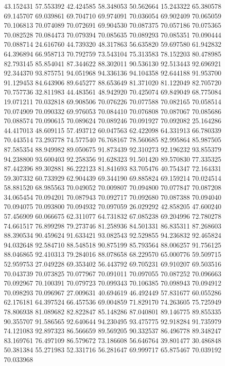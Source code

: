 43.152431
57.553392
42.424585
58.348053
50.562664
15.243322
65.380578
69.145707
69.039861
69.704710
69.974091
70.036054
69.902409
70.065059
70.106813
70.074089
70.072691
69.904530
70.087375
70.057186
70.075365
70.082528
70.084473
70.079394
70.085635
70.089293
70.085351
70.090444
70.088714
24.616760
44.739320
48.317863
56.635820
59.697580
61.942832
64.396894
66.958713
70.792759
73.543104
75.313583
78.152203
80.478985
82.793145
85.854041
87.344622
88.302011
90.536130
92.513443
92.696921
92.344370
93.875751
94.051968
94.336136
94.104358
92.644188
91.953700
91.129453
84.643906
89.645277
88.653649
81.371020
81.122049
82.705720
70.757736
32.811983
44.483561
48.942920
70.425074
69.849049
68.775084
19.071211
70.032818
69.908506
70.076226
70.077588
70.082165
70.058514
70.074909
70.090332
69.976053
70.084410
70.076808
70.087067
70.085686
70.088574
70.090615
70.089624
70.089246
70.091927
70.092082
25.164286
44.417013
48.609115
57.493712
60.047563
62.422098
64.331913
66.780339
70.443514
73.293778
74.577540
76.768167
78.560685
82.995864
85.987505
87.585354
88.949982
89.050675
91.873439
92.310273
92.196232
93.855379
94.238800
93.600403
92.258356
91.628323
91.501420
89.570830
77.335325
87.442396
89.302881
86.222123
81.841693
83.705476
40.754347
72.164331
59.307332
60.733929
62.904439
69.344190
69.885824
69.159214
70.024514
58.881520
68.985563
70.049052
70.009807
70.094800
70.077847
70.087208
34.065454
70.094201
70.087943
70.092717
70.092680
70.087388
70.094040
70.094075
70.093800
70.094932
70.097059
26.029292
42.858205
47.600240
57.456909
60.066675
62.311077
64.731832
67.085238
69.204996
72.780278
74.661517
76.899298
79.273746
81.258936
84.501331
86.835311
87.268603
88.390534
90.459624
91.633421
93.082543
92.529855
94.236832
92.465824
94.032648
92.584710
88.548518
90.875199
85.793564
88.006257
91.756125
88.046865
92.410313
79.284016
88.078658
68.229570
65.000776
59.509715
52.959753
27.049228
69.353402
56.443792
69.705231
69.910207
69.503516
70.043739
70.073825
70.077967
70.091011
70.097055
70.087252
70.096663
70.092967
70.100391
70.079723
70.099343
70.106385
70.098943
70.094912
70.098293
70.096967
27.009631
40.694619
46.492449
57.831677
60.055286
62.176181
64.397524
66.457536
69.004859
71.829170
74.263605
75.725949
78.806938
81.089682
82.822847
85.148286
87.040801
89.146775
89.855335
90.355707
91.586565
92.640644
94.230495
93.475775
92.918284
91.735979
74.121083
92.897323
86.566659
89.569205
90.332537
86.496778
89.348247
83.169761
76.497109
86.579672
73.186608
56.646764
39.801477
30.486848
50.381384
55.271983
52.331716
56.281647
69.999717
65.875467
70.039192
70.033968

